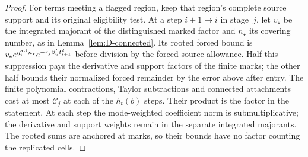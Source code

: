 \begin{proof}
For terms meeting a flagged region, keep that region's complete source support and its original eligibility test. At a step $i+1\to i$ in stage~$j$, let $v_\star$ be the integrated majorant of the distinguished marked factor and $n_\star$ its covering number, as in Lemma~\ref{lem:D-connected}. Its rooted forced bound is $v_\star e^{\eta^{\rm att}_in_\star}e^{-r_j\beta'_u t_{i+1}^2}$ before division by the forced source allowance. Half this suppression pays the derivative and support factors of the finite marks; the other half bounds their normalized forced remainder by the error above after entry. The finite polynomial contractions, Taylor subtractions and connected attachments cost at most $\mathcal C_j$ at each of the $h_t(b)$ steps. Their product is the factor in the statement. At each step the mode-weighted coefficient norm is submultiplicative; the derivative and support weights remain in the separate integrated majorants. The rooted sums are anchored at marks, so their bounds have no factor counting the replicated cells.
\end{proof}

